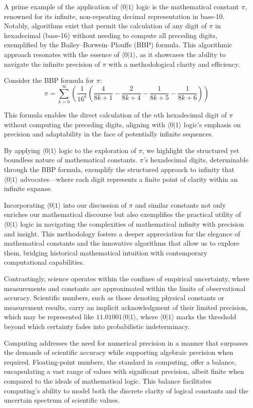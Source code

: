 \documentclass[12pt]{article}
\newcommand{\qbit}{\langle 0 | 1 \rangle}
\begin{document}
A prime example of the application of \(\qbit\) logic is the mathematical constant \(\pi\), renowned for its infinite, non-repeating decimal representation in base-10. Notably, algorithms exist that permit the calculation of any digit of \(\pi\) in hexadecimal (base-16) without needing to compute all preceding digits, exemplified by the Bailey–Borwein–Plouffe (BBP) formula. This algorithmic approach resonates with the essence of \(\qbit\), as it showcases the ability to navigate the infinite precision of \(\pi\) with a methodological clarity and efficiency.

Consider the BBP formula for \(\pi\):
\[ \pi = \sum_{k=0}^{\infty} \left( \frac{1}{16^k} \left( \frac{4}{8k + 1} - \frac{2}{8k + 4} - \frac{1}{8k + 5} - \frac{1}{8k + 6} \right) \right) \]

This formula enables the direct calculation of the \(n\)th hexadecimal digit of \(\pi\) without computing the preceding digits, aligning with \(\qbit\) logic’s emphasis on precision and adaptability in the face of potentially infinite sequences.

By applying \(\qbit\) logic to the exploration of \(\pi\), we highlight the structured yet boundless nature of mathematical constants. \(\pi\)'s hexadecimal digits, determinable through the BBP formula, exemplify the structured approach to infinity that \(\qbit\) advocates—where each digit represents a finite point of clarity within an infinite expanse.

Incorporating \(\qbit\) into our discussion of \(\pi\) and similar constants not only enriches our mathematical discourse but also exemplifies the practical utility of \(\qbit\) logic in navigating the complexities of mathematical infinity with precision and insight. This methodology fosters a deeper appreciation for the elegance of mathematical constants and the innovative algorithms that allow us to explore them, bridging historical mathematical intuition with contemporary computational capabilities.

Contrastingly, science operates within the confines of empirical uncertainty, where measurements and constants are approximated within the limits of observational accuracy. Scientific numbers, such as those denoting physical constants or measurement results, carry an implicit acknowledgment of their limited precision, which may be represented like \(11.01001\qbit\), where \(\qbit\) marks the threshold beyond which certainty fades into probabilistic indeterminacy.

Computing addresses the need for numerical precision in a manner that surpasses the demands of scientific accuracy while supporting algebraic precision when required. Floating-point numbers, the standard in computing, offer a balance, encapsulating a vast range of values with significant precision, albeit finite when compared to the ideals of mathematical logic. This balance facilitates computing's ability to model both the discrete clarity of logical constants and the uncertain spectrum of scientific values.
\end{document}
